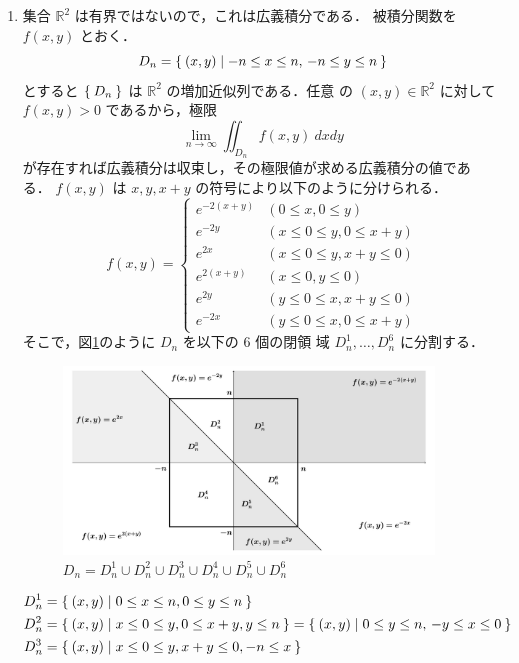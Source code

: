 \documentclass[11pt, uplatex, dvipdfmx]{jsarticle}
\begin{document}
\begin{enumerate}[(1)]
   \item 集合 $\mathbb{R}^2$ は有界ではないので，これは広義積分である．
     被積分関数を $f(x,y)$ とおく．
     \[
       D_n=\Set{(x,y)  |  -n \leq x \leq n, \, -n \leq y \leq n }
     \]
     とすると $\Set{ D_n}$ は $\mathbb{R}^2$ の増加近似列である．任意
     の $(x,y) \in \mathbb{R}^2$ に対して $f(x,y)>0$ であるから，極限
     \[
       \lim_{n \to \infty} \iint_{D_n} f(x,y) \ dxdy
     \]
     が存在すれば広義積分は収束し，その極限値が求める広義積分の値であ
     る． $f(x,y)$ は $x, y, x+y$ の符号により以下のように分けられる．
     \[
       f(x,y)=
       \begin{cases}
         e^{-2(x+y)} & \left(0 \leq x , 0 \leq y \right)\\
         e^{-2y} & \left( x \leq 0 \leq y,  0 \leq x+y \right)\\
         e^{2x} & \left( x \leq 0 \leq y,  x+y \leq 0  \right)\\
         e^{2(x+y)} & \left( x \leq 0, y \leq 0 \right)\\
         e^{2y} & \left( y \leq 0 \leq x, x+y \leq 0\right)\\
         e^{-2x} & \left( y \leq 0 \leq x, 0 \leq x+y \right)
       \end{cases}
     \]
     そこで，図\ref{fig:no24}のように $D_n$ を以下の $6$ 個の閉領
     域 $D_n^1, \ldots, D_n^6$ に分割する．
     \begin{figure}[h]
       \centering
       \includegraphics[height=5cm]{./pictures/no24.pdf}
       \caption{ $D_n= D_n^1 \cup D_n^2 \cup D_n^3 \cup D_n^4 \cup D_n^5 \cup D_n^6 $}\label{fig:no24}
     \end{figure}
     \begin{align*}
       & D_n^1 =\Set{(x,y)  |  0 \leq x \leq n, 0 \leq y \leq n}\\
       & D_n^2 =\Set{(x,y)  |  x \leq 0 \leq y, 0 \leq x+y, y \leq n} 
         = \Set{ (x,y) | 0 \leq y \leq n, \, -y \leq x \leq 0}\\
       & D_n^3 =\Set{(x,y)  | x \leq 0 \leq y, x+y \leq 0, -n \leq x}

\end{align*}
\end{enumerate}
\end{document}
